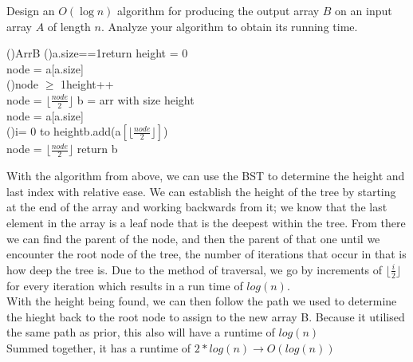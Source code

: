 \documentclass[12pt]{article}
\begin{document}
Design an $O(\log n)$ algorithm for producing the output array $B$
on an input array $A$ of length $n$. Analyze your algorithm to obtain
its running time.\\
\begin{algorithm}[H]
    \Fn(){ArrB}{
    \SetAlgoLined
    \SetNoFillComment
    \DontPrintSemicolon
    \If(){a.size==1}{return}
    height = 0\\
    node = a[a.size]\\
    \While(){node $\geq$ 1}{height++\\node = $\lfloor \frac{node}{2}\rfloor$  }
    b = arr with size height\\
    node = a[a.size]\\
    \For(){i= 0 to height}{b.add(a$[\lfloor \frac{node}{2}\rfloor]$)\\node = $\lfloor \frac{node}{2}\rfloor$}
    return b
    }
\end{algorithm}

With the algorithm from above, we can use the BST to determine the height and last index with relative ease. We can establish the height of the tree by starting at the end of the array and working backwards from it; we know that the last element in the array is a leaf node that is the deepest within the tree. From there we can find the parent of the node, and then the parent of that one until we encounter the root node of the tree, the number of iterations that occur in that is how deep the tree is. Due to the method of traversal, we go by increments of $\lfloor \frac{i}{2} \rfloor$ for every iteration which results in a run time of $log(n)$.\\
With the height being found, we can then follow the path we used to determine the hieght back to the root node to assign to the new array B. Because it utilised the same path as prior, this also will have a runtime of $log(n)$\\
Summed together, it has a runtime of $2*log(n) \rightarrow O(log(n))$
\end{document}
